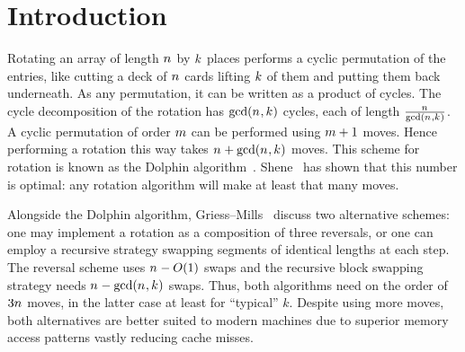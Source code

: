   
  \date{}

  \maketitle

  
  \begin{abstract}
    We discuss a modification to the Gries--Mills block swapping
    scheme for in-place rotation with average costs of 1.85 moves per
    element and worst case performance still at 3 moves per element.
    Analysis of the average case relies on the asymptotic behavior of the
    sum of remainders in the Euclidean algorithm.
  \end{abstract}

  \section{Introduction}\label{sec.intro}
  Rotating an array of length $n_{}$ by $k_{}$ places performs a
  cyclic permutation of the entries, like cutting a deck of $n_{}$
  cards lifting $k_{}$ of them and putting them back underneath. As
  any permutation, it can be written as a product of cycles.  The
  cycle decomposition of the rotation has $\gcd(n_{},k_{})$ cycles,
  each of length $\frac{n_{}}{\gcd(n_{},k_{})}$. A 
  cyclic permutation of order $m$ can be performed using $m+1$
  moves. %
  Hence performing a
  rotation this way takes $n_{}+\gcd(n_{},k_{})$ moves. This scheme
  for rotation is known as the Dolphin
  algorithm~\cite[Section~4]{GriesMills81}. Shene~\cite{Shene97} has
  shown that this number is optimal: any rotation algorithm will make at
  least that many moves.

  Alongside the Dolphin algorithm, Griess--Mills~\cite{GriesMills81}
  discuss two alternative schemes: one may implement a rotation as a
  composition of three reversals, or one can employ a recursive strategy
  swapping segments of identical lengths at each step. The reversal
  scheme uses $n_{}-O(1)$ swaps and the recursive block swapping
  strategy needs $n_{}-\gcd(n_{},k_{})$ swaps. Thus, both algorithms
  need on the order of $3n_{}$ moves, in the latter case at least for
  ``typical'' $k$. Despite using more moves, both alternatives are better
  suited to modern machines due to superior memory access patterns vastly
  reducing cache misses.
  
